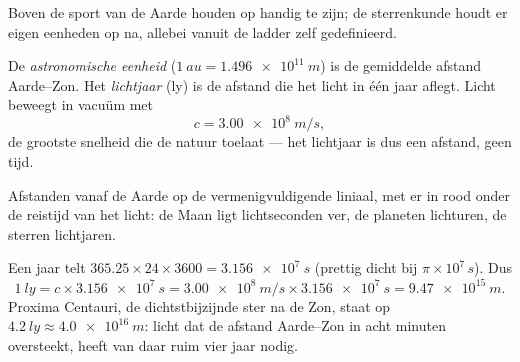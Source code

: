 Boven de sport van de Aarde houden  op handig te zijn; de
sterrenkunde houdt er eigen eenheden op na, allebei vanuit de ladder
zelf gedefinieerd.

\begin{definition}\label{def:g10:orders-of-magnitude:lightyear}
De \emph{astronomische eenheid}
($\qty{1}{au} = \qty{1.496e11}{m}$) is de gemiddelde afstand
Aarde--Zon. Het \emph{lichtjaar} (\unit{ly}) is de
afstand die het licht in één jaar aflegt. Licht beweegt in vacuüm met
\[
c = \qty{3.00e8}{m/s},
\]
de grootste snelheid die de natuur toelaat --- het lichtjaar is dus een
afstand, geen tijd.
\end{definition}

\begin{omfigure}

{\small Afstanden vanaf de Aarde op de vermenigvuldigende liniaal, met
er in rood onder de reistijd van het licht: de Maan ligt lichtseconden
ver, de planeten lichturen, de sterren lichtjaren.}
\end{omfigure}

\begin{example}\label{ex:g10:orders-of-magnitude:ly}
Een jaar telt $365.25 \times 24 \times 3600 = \qty{3.156e7}{s}$
(prettig dicht bij $\pi \times 10^{7}\,\unit{s}$). Dus
\[
\qty{1}{ly} = c \times \qty{3.156e7}{s}
= \qty{3.00e8}{m/s} \times \qty{3.156e7}{s}
= \qty{9.47e15}{m}.
\]
Proxima Centauri, de dichtstbijzijnde ster na de Zon, staat op
$\qty{4.2}{ly} \approx \qty{4.0e16}{m}$: licht dat de afstand
Aarde--Zon in acht minuten oversteekt, heeft van daar ruim vier jaar
nodig.
\end{example}

